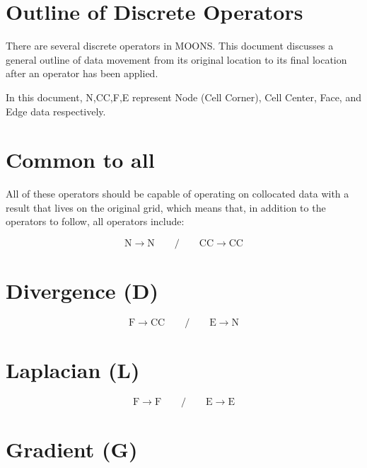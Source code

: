 \documentclass[11pt]{article}
\begin{document}
\doublespacing
\MOONSTITLE
\maketitle

\section{Outline of Discrete Operators}

There are several discrete operators in MOONS. This document discusses a general outline of data movement from its original location to its final location after an operator has been applied.

In this document, N,CC,F,E represent Node (Cell Corner), Cell Center, Face, and Edge data respectively.

\section{Common to all}

All of these operators should be capable of operating on collocated data with a result that lives on the original grid, which means that, in addition to the operators to follow, all operators include:

\begin{equation}
	\text{N} \rightarrow \text{N}
	\qquad / \qquad
	\text{CC} \rightarrow \text{CC}
\end{equation}


\section{Divergence (D)}

\begin{equation}
	\text{F} \rightarrow \text{CC}
	\qquad / \qquad
	\text{E} \rightarrow \text{N}
\end{equation}

\section{Laplacian (L)}

\begin{equation}
	\text{F} \rightarrow \text{F}
	\qquad / \qquad
	\text{E} \rightarrow \text{E}
\end{equation}

\section{Gradient (G)}
\end{document}
